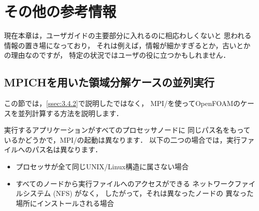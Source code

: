 \chapter{その他の参考情報}
\label{chap:B}
現在本章は，ユーザガイドの主要部分に入れるのに相応わしくないと
思われる情報の置き場になっており，
それは例えば，情報が細かすぎるとか，古いとかの理由なのですが，
特定の状況ではユーザの役に立つかもしれません．



\section{MPICHを用いた領域分解ケースの並列実行}
\label{sec:B.1}
%
%
%
%
この節では，\autoref{ssec:3.4.2}で説明したではなく，
MPI/を使ってOpenFOAMのケースを並列計算する方法を説明します．

実行するアプリケーションがすべてのプロセッサノードに
同じパス名をもっているかどうかで，MPI/の起動は異なります．
以下の二つの場合では，実行ファイルへのパス名は異なります．
\begin{itemize}
 \item プロセッサが全て同じUNIX/Linux構造に属さない場合
 \item すべてのノードから実行ファイルへのアクセスができる
       ネットワークファイルシステム (NFS) がなく，
       したがって，それは異なったノードの
       異なった場所にインストールされる場合
\end{itemize}


